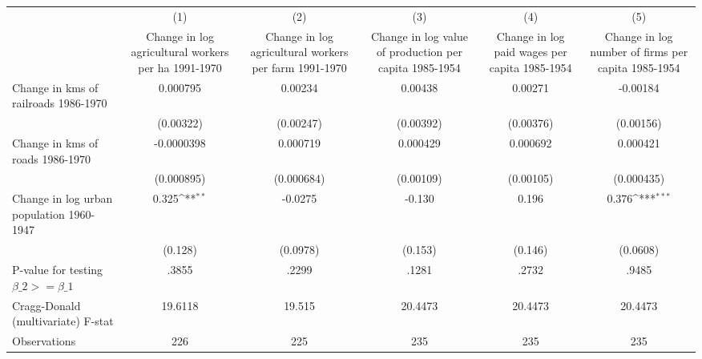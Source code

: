 {
\def\sym#1{\ifmmode^{#1}\else\(^{#1}\)\fi}
\begin{tabular}{l*{5}{c}}
\hline\hline
                &\multicolumn{1}{c}{(1)}&\multicolumn{1}{c}{(2)}&\multicolumn{1}{c}{(3)}&\multicolumn{1}{c}{(4)}&\multicolumn{1}{c}{(5)}\\
                &\multicolumn{1}{c}{Change in log agricultural workers per ha 1991-1970}&\multicolumn{1}{c}{Change in log agricultural workers per farm 1991-1970}&\multicolumn{1}{c}{Change in log value of production per capita 1985-1954}&\multicolumn{1}{c}{Change in log paid wages per capita 1985-1954}&\multicolumn{1}{c}{Change in log number of firms per capita 1985-1954}\\
\hline
Change in kms of railroads 1986-1970& 0.000795         &  0.00234         &  0.00438         &  0.00271         & -0.00184         \\
                &(0.00322)         &(0.00247)         &(0.00392)         &(0.00376)         &(0.00156)         \\
[1em]
Change in kms of roads 1986-1970&-0.0000398         & 0.000719         & 0.000429         & 0.000692         & 0.000421         \\
                &(0.000895)         &(0.000684)         &(0.00109)         &(0.00105)         &(0.000435)         \\
[1em]
Change in log urban population 1960-1947&    0.325\sym{**} &  -0.0275         &   -0.130         &    0.196         &    0.376\sym{***}\\
                &  (0.128)         & (0.0978)         &  (0.153)         &  (0.146)         & (0.0608)         \\
\hline
P-value for testing $\beta\_{2} >= \beta\_{1}$&    .3855         &    .2299         &    .1281         &    .2732         &    .9485         \\
Cragg-Donald (multivariate) F-stat&  19.6118         &   19.515         &  20.4473         &  20.4473         &  20.4473         \\
Observations    &      226         &      225         &      235         &      235         &      235         \\
\hline\hline
\end{tabular}
}
